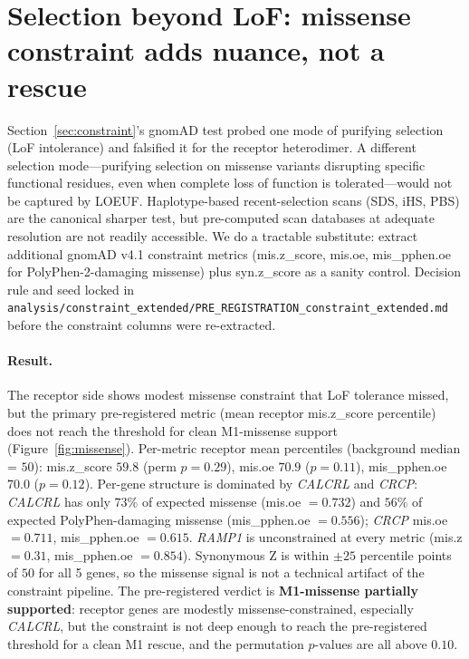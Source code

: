 \documentclass[11pt]{article}
\begin{document}
\section{Selection beyond LoF: missense constraint adds nuance, not a rescue}
\label{sec:missense}

Section~\ref{sec:constraint}'s gnomAD test probed one mode of purifying selection (LoF intolerance) and falsified it for the receptor heterodimer. A different selection mode---purifying selection on missense variants disrupting specific functional residues, even when complete loss of function is tolerated---would not be captured by LOEUF. Haplotype-based recent-selection scans (SDS, iHS, PBS) are the canonical sharper test, but pre-computed scan databases at adequate resolution are not readily accessible. We do a tractable substitute: extract additional gnomAD v4.1 constraint metrics (mis.z\_score, mis.oe, mis\_pphen.oe for PolyPhen-2-damaging missense) plus syn.z\_score as a sanity control. Decision rule and seed locked in \texttt{analysis/constraint\_extended/PRE\_REGISTRATION\_constraint\_extended.md} before the constraint columns were re-extracted.

\paragraph{Result.} The receptor side shows modest missense constraint that LoF tolerance missed, but the primary pre-registered metric (mean receptor mis.z\_score percentile) does not reach the threshold for clean M1-missense support (Figure~\ref{fig:missense}). Per-metric receptor mean percentiles (background median = $50$): mis.z\_score $59.8$ (perm $p = 0.29$), mis.oe $70.9$ ($p = 0.11$), mis\_pphen.oe $70.0$ ($p = 0.12$). Per-gene structure is dominated by \textit{CALCRL} and \textit{CRCP}: \textit{CALCRL} has only $73\%$ of expected missense (mis.oe $= 0.732$) and $56\%$ of expected PolyPhen-damaging missense (mis\_pphen.oe $= 0.556$); \textit{CRCP} mis.oe $= 0.711$, mis\_pphen.oe $= 0.615$. \textit{RAMP1} is unconstrained at every metric (mis.z $= 0.31$, mis\_pphen.oe $= 0.854$). Synonymous Z is within $\pm 25$ percentile points of $50$ for all 5 genes, so the missense signal is not a technical artifact of the constraint pipeline. The pre-registered verdict is \textbf{M1-missense partially supported}: receptor genes are modestly missense-constrained, especially \textit{CALCRL}, but the constraint is not deep enough to reach the pre-registered threshold for a clean M1 rescue, and the permutation $p$-values are all above $0.10$.
\end{document}
